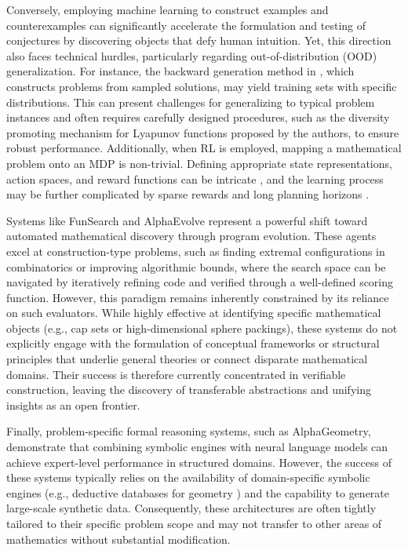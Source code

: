 \documentclass[11pt]{article}
\numberwithin{equation}{section}
\begin{document}
Conversely, employing machine learning to construct examples and counterexamples can significantly accelerate the formulation and testing of conjectures by discovering objects that defy human intuition. Yet, this direction also faces technical hurdles, particularly regarding out-of-distribution (OOD) generalization. For instance, the backward generation method in \cite{alfarano2024global}, which constructs problems from sampled solutions, may yield training sets with specific distributions. This can present challenges for generalizing to typical problem instances and often requires carefully designed procedures, such as the diversity promoting mechanism for Lyapunov functions proposed by the authors, to ensure robust performance. Additionally, when RL is employed, mapping a mathematical problem onto an MDP is non-trivial. Defining appropriate state representations, action spaces, and reward functions can be intricate \cite{wagner2021constructions}, and the learning process may be further complicated by sparse rewards and long planning horizons \cite{shehper2025what}.

Systems like FunSearch and AlphaEvolve represent a powerful shift toward automated mathematical discovery through program evolution. These agents excel at construction-type problems, such as finding extremal configurations in combinatorics or improving algorithmic bounds, where the search space can be navigated by iteratively refining code and verified through a well-defined scoring function. However, this paradigm remains inherently constrained by its reliance on such evaluators. While highly effective at identifying specific mathematical objects (e.g., cap sets or high-dimensional sphere packings), these systems do not explicitly engage with the formulation of conceptual frameworks or structural principles that underlie general theories or connect disparate mathematical domains. Their success is therefore currently concentrated in verifiable construction, leaving the discovery of transferable abstractions and unifying insights as an open frontier.

Finally, problem-specific formal reasoning systems, such as AlphaGeometry, demonstrate that combining symbolic engines with neural language models can achieve expert-level performance in structured domains. However, the success of these systems typically relies on the availability of domain-specific symbolic engines (e.g., deductive databases for geometry \cite{chou2000deductive}) and the capability to generate large-scale synthetic data. Consequently, these architectures are often tightly tailored to their specific problem scope and may not transfer to other areas of mathematics without substantial modification.
\end{document}
